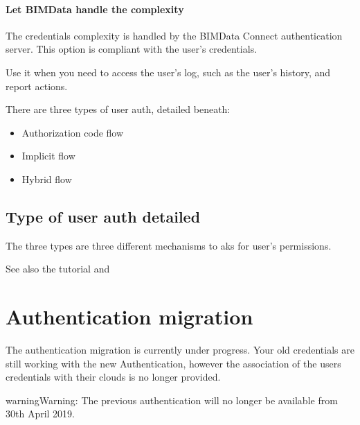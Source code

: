 \documentclass[a4paper,12pt,english]{sphinxmanual}
\begin{document}
\paragraph{Let BIMData handle the complexity}
\label{\detokenize{guide/authentication_bimdata_connect:let-bimdata-handle-the-complexity}}
The credentials complexity is handled by the BIMData Connect authentication server.
This option is compliant with the user’s credentials.

Use it when you need to access the user’s log, such as the user’s history, and report actions.

There are three types of user auth, detailed beneath:
\begin{itemize}
\item {} 
Authorization code flow

\item {} 
Implicit flow

\item {} 
Hybrid flow

\end{itemize}


\subsection{Type of user auth detailed}
\label{\detokenize{guide/authentication_bimdata_connect:type-of-user-auth-detailed}}
The three types are three different mechanisms to aks for user’s permissions.




See also the tutorial {\hyperref[\detokenize{tutorials/retrieve-elements::doc}]{}}
and {\hyperref[\detokenize{cookbook/index::doc}]{}}




\section{Authentication migration}
\label{\detokenize{guide/authentication_migration:authentication-migration}}\label{\detokenize{guide/authentication_migration::doc}}
The authentication migration is currently under progress.
Your old credentials are still working with the new Authentication, however the association of the users credentials with their clouds is no longer provided.

\begin{sphinxadmonition}{warning}{Warning:}
The previous authentication will no longer be available from 30th April 2019.
\end{sphinxadmonition}
\end{document}
